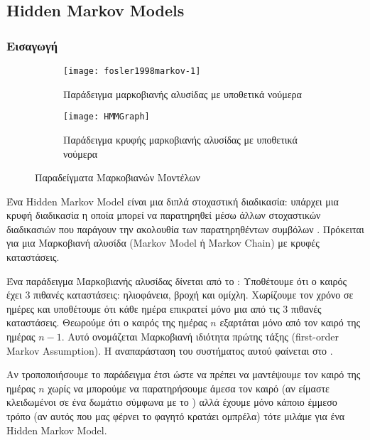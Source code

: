 \newcommand*{\hmm}{Hidden Markov Models}%
\subsection{\hmm{}}
\subsubsection{Εισαγωγή}
\begin{figure}[htb]
    \centering
    \begin{subfigure}{0.48\linewidth}
            \centering
            \texttt{[image: fosler1998markov-1]}
            \caption{Παράδειγμα μαρκοβιανής αλυσίδας με υποθετικά νούμερα \protect\cite{fosler1998markov}}
            \label{fig:fosler1998markov-1}
    \end{subfigure}\hfill
    \begin{subfigure}{0.48\linewidth}
            \centering
            \texttt{[image: HMMGraph]}
            \caption{Παράδειγμα κρυφής μαρκοβιανής αλυσίδας με υποθετικά νούμερα \protect\cite{wikiHMM}}
            \label{fig:HMMGraph}
    \end{subfigure}
    \caption{Παραδείγματα Μαρκοβιανών Μοντέλων}
\end{figure}
Ένα Hidden Markov Model είναι μια διπλά στοχαστική διαδικασία:
υπάρχει μια κρυφή διαδικασία η οποία μπορεί να παρατηρηθεί μέσω άλλων στοχαστικών διαδικασιών που παράγουν την ακολουθία των παρατηρηθέντων συμβόλων \cite{rabiner1986introduction}.
Πρόκειται για μια Μαρκοβιανή αλυσίδα (Markov Model ή Markov Chain) με κρυφές καταστάσεις.

Ένα παράδειγμα Μαρκοβιανής αλυσίδας δίνεται από το \cite{fosler1998markov}:
Υποθέτουμε ότι ο καιρός έχει 3 πιθανές καταστάσεις: ηλιοφάνεια, βροχή και ομίχλη.
Χωρίζουμε τον χρόνο σε ημέρες και υποθέτουμε ότι κάθε ημέρα επικρατεί μόνο μια από τις 3 πιθανές καταστάσεις.
Θεωρούμε ότι ο καιρός της ημέρας $n$ εξαρτάται μόνο από τον καιρό της ημέρας $n-1$.
Αυτό ονομάζεται Μαρκοβιανή ιδιότητα πρώτης τάξης (first-order Markov Assumption).
Η αναπαράσταση του συστήματος αυτού φαίνεται στο .

Αν τροποποιήσουμε το παράδειγμα έτσι ώστε να πρέπει να μαντέψουμε τον καιρό της ημέρας $n$ χωρίς να μπορούμε να παρατηρήσουμε άμεσα τον καιρό (αν είμαστε κλειδωμένοι σε ένα δωμάτιο σύμφωνα με το \cite{fosler1998markov})
αλλά έχουμε μόνο κάποιο έμμεσο τρόπο (αν αυτός που μας φέρνει το φαγητό κρατάει ομπρέλα) τότε μιλάμε για ένα Hidden Markov Model.

